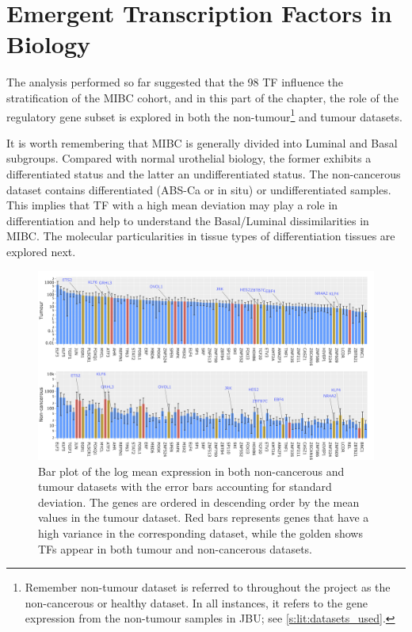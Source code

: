 \section{Emergent Transcription Factors in Biology} \label{s:N_I:sel_tfs_bio}

The analysis performed so far suggested that the 98 TF influence the stratification of the MIBC cohort, and in this part of the chapter, the role of the regulatory gene subset is explored in both the non-tumour\footnote{Remember non-tumour dataset is referred to throughout the project as the non-cancerous or healthy dataset. In all instances, it refers to the gene expression from the non-tumour samples in JBU; see \cref{s:lit:datasets_used}.} and tumour datasets.

It is worth remembering that MIBC is generally divided into Luminal and Basal subgroups. Compared with normal urothelial biology, the former exhibits a differentiated status and the latter an undifferentiated status. The non-cancerous dataset contains differentiated (ABS-Ca or in situ) or undifferentiated samples. This implies that TF with a high mean deviation may play a role in differentiation and help to understand the Basal/Luminal dissimilarities in MIBC. The molecular particularities in tissue types of differentiation tissues are explored next.

\begin{figure}[!b]   
    \centering
    \includegraphics[width=1.0\textwidth,height=1.0\textheight,keepaspectratio]{Sections/Network_I/Resources/selective_pruning/sel_tfs/sel_tfs_var_tum_healthy.png}
      \caption[Mean expression of the 98 TF in tumour and healthy samples]{Bar plot of the log mean expression in both non-cancerous and tumour datasets with the error bars accounting for standard deviation. The genes are ordered in descending order by the mean values in the tumour dataset. Red bars represents genes that have a high variance in the corresponding dataset, while the golden shows TFs appear in both tumour and non-cancerous datasets.}
    \label{fig:N_I:sel_tfs_var}
\end{figure}

